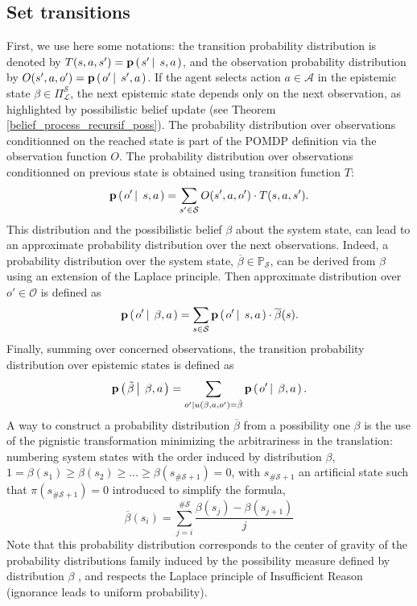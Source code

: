 \subsection{Set transitions}
\label{setTrans}
First, we use here some notations:
the transition probability distribution is denoted by $T(s,a,s') = \textbf{p} \left( \left. s' \, \right| \left. \, s,a \right. \right)$,
and the observation probability distribution by $O(s',a,o') = \textbf{p} \left( \left.  o' \, \right| \left. \, s',a \right. \right)$.
If the agent selects action $a \in \mathcal{A}$ in the 
epistemic state $\beta \in \Pi^{\mathcal{S}}_{\mathcal{L}}$, 
the next epistemic state depends only on the next observation,
as highlighted by possibilistic belief update (see Theorem \ref{belief_process_recursif_poss}).
 The probability distribution over observations conditionned on the 
reached state is part of the POMDP definition via the observation function $O$. 
The probability distribution over observations conditionned on previous state is obtained using transition function $T$:
\[ \textbf{p} \left( \left.  o' \, \right| \left. \, s,a  \right. \right) = \sum_{s' \in \mathcal{S}} O(s',a,o') \cdot T(s,a,s') . \]
This distribution and the possibilistic belief $\beta$ about the system state, 
can lead to an approximate probability distribution over the next observations. Indeed,
a probability distribution over the system state, 
$\overline{\beta} \in \mathbb{P}_{\mathcal{S}}$, 
can be derived from $\beta$
using an extension of the Laplace principle.
Then approximate distribution over $o' \in \mathcal{O}$ is defined as
\begin{equation}
\label{obsProb}
\textbf{p} \left( \left.  o' \, \right| \left. \, \beta,a   \right. \right) = \sum_{s \in \mathcal{S}} \textbf{p} \left( \left.  o' \, \right| \left. \, s, a  \right. \right) \cdot \overline{\beta}(s) .
\end{equation}
Finally, summing over concerned observations,
the transition probability distribution 
over epistemic states is defined as
\begin{equation}
\label{epistemTrans}
\textbf{p} \left( \left.  \tilde{\beta} \, \right| \left. \, \beta, a  \right. \right) = \sum_{o' | u(\beta,a,o')=\tilde{\beta }} \textbf{p} \left( \left.  o' \, \right| \left. \, \beta,a   \right. \right).
\end{equation}
A way to construct a probability distribution $\overline{\beta}$ from
a possibility one $\beta$ is the use of the pignistic transformation
\cite{Du2006.7} minimizing the arbitrariness
in the translation:
numbering system states with the order induced by distribution $\beta$,
$1 = \beta(s_1) \geqslant \beta(s_2) \geqslant 
\ldots \geqslant \beta(s_{\# \mathcal{S}+1}) = 0$, 
with $s_{\# \mathcal{S}+1}$ an artificial state such that $\pi(s_{\# \mathcal{S}+1})=0$ 
introduced to simplify the formula,
\begin{equation}
\label{transform} \overline{\beta}(s_i) = \sum_{j=i}^{\# \mathcal{S}} \frac{\beta(s_j) - \beta(s_{j+1})}{j}
\end{equation}
Note that this probability distribution corresponds to the center of gravity
of the probability distributions family induced by the possibility measure 
defined by distribution $\beta$ \cite{Dubois93onpossibility/probability}, and
respects the Laplace principle of Insufficient Reason (ignorance 
leads to uniform probability).

